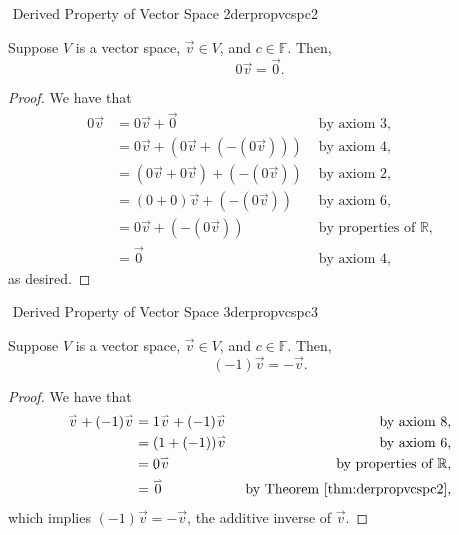         \begin{theorem}{\Stop\,\,Derived Property of Vector Space 2}{derpropvcspc2}

            Suppose \(V\) is a vector space, \(\vec{v}\in V\), and \(c\in\mathbb{F}\). Then,
            \begin{equation*}
                0\vec{v}=\vec{0}.
            \end{equation*}
            \begin{proof}
                We have that
                \begin{align*}
                    0\vec{v}&=0\vec{v}+\vec{0} &\text{ by axiom \(3\),} \\
                    &=0\vec{v}+(0\vec{v}+(-(0\vec{v}))) &\text{ by axiom \(4\),} \\
                    &=(0\vec{v}+0\vec{v})+(-(0\vec{v})) &\text{ by axiom \(2\),} \\
                    &=(0+0)\vec{v}+(-(0\vec{v})) &\text{ by axiom \(6\),} \\
                    &=0\vec{v}+(-(0\vec{v})) &\text{ by properties of \(\mathbb{R}\),} \\
                    &=\vec{0} &\text{ by axiom \(4\),}
                \end{align*}
                as desired.
            \end{proof}
        \end{theorem}
        \pagebreak
        \begin{theorem}{\Stop\,\,Derived Property of Vector Space 3}{derpropvcspc3}

            Suppose \(V\) is a vector space, \(\vec{v}\in V\), and \(c\in\mathbb{F}\). Then,
            \begin{equation*}
                (-1)\vec{v}=-\vec{v}.
            \end{equation*}
            \begin{proof}
                We have that
                \begin{align*}
                    \vec{v}+(-1)\vec{v}&=1\vec{v}+(-1)\vec{v} &\text{ by axiom \(8\),} \\
                    &=(1+(-1))\vec{v} &\text{ by axiom \(6\),} \\
                    &=0\vec{v} &\text{ by properties of \(\mathbb{R}\),} \\
                    &=\vec{0} &\text{ by Theorem \ref{thm:derpropvcspc2},}
                \end{align*}
                which implies \((-1)\vec{v}=-\vec{v}\), the additive inverse of \(\vec{v}\).
            \end{proof}
        \end{theorem}
